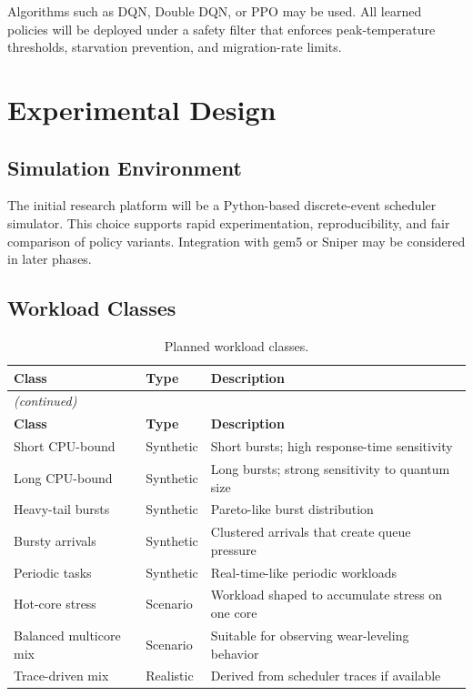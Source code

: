 \documentclass[12pt,a4paper]{article}
\begin{document}
Algorithms such as DQN, Double DQN, or PPO may be used. All learned policies will be deployed under a safety filter
that enforces peak-temperature thresholds, starvation prevention, and migration-rate limits.

\section{Experimental Design}

\subsection{Simulation Environment}

The initial research platform will be a Python-based discrete-event scheduler simulator. This choice supports rapid
experimentation, reproducibility, and fair comparison of policy variants. Integration with gem5 or Sniper may be
considered in later phases.

\subsection{Workload Classes}

\begin{longtable}{@{}p{3.3cm}p{2.1cm}p{8.0cm}@{}}
\caption{Planned workload classes.}\\
\toprule
\textbf{Class} & \textbf{Type} & \textbf{Description} \\
\midrule
\endfirsthead
\multicolumn{3}{l}{\small\itshape (continued)}\\
\toprule
\textbf{Class} & \textbf{Type} & \textbf{Description} \\
\midrule
\endhead
\bottomrule
\endfoot

Short CPU-bound & Synthetic & Short bursts; high response-time sensitivity \\
Long CPU-bound & Synthetic & Long bursts; strong sensitivity to quantum size \\
Heavy-tail bursts & Synthetic & Pareto-like burst distribution \\
Bursty arrivals & Synthetic & Clustered arrivals that create queue pressure \\
Periodic tasks & Synthetic & Real-time-like periodic workloads \\
Hot-core stress & Scenario & Workload shaped to accumulate stress on one core \\
Balanced multicore mix & Scenario & Suitable for observing wear-leveling behavior \\
Trace-driven mix & Realistic & Derived from scheduler traces if available \\
\end{longtable}
\end{document}
